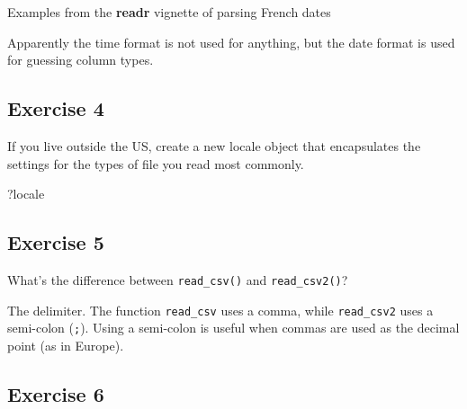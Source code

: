 \documentclass[]{book}
\newenvironment{Shaded}{\begin{snugshade}}{\end{snugshade}}
\newcommand{\CommentTok}[1]{\textcolor[rgb]{0.56,0.35,0.01}{\textit{#1}}}
\newcommand{\DataTypeTok}[1]{\textcolor[rgb]{0.13,0.29,0.53}{#1}}
\newcommand{\KeywordTok}[1]{\textcolor[rgb]{0.13,0.29,0.53}{\textbf{#1}}}
\newcommand{\NormalTok}[1]{#1}
\newcommand{\StringTok}[1]{\textcolor[rgb]{0.31,0.60,0.02}{#1}}
\theoremstyle{definition}
\theoremstyle{definition}
\theoremstyle{definition}
\theoremstyle{remark}
\begin{document}
Examples from the \textbf{readr} vignette of parsing French dates

\begin{Shaded}
\end{Shaded}

Apparently the time format is not used for anything, but the date format
is used for guessing column types.

\hypertarget{exercise-4-11}{%
\subsection{Exercise 4}\label{exercise-4-11}}

If you live outside the US, create a new locale object that encapsulates
the settings for the types of file you read most commonly.

\begin{Shaded}
\begin{Highlighting}[]
\NormalTok{?locale}
\end{Highlighting}
\end{Shaded}

\hypertarget{exercise-5-6}{%
\subsection{Exercise 5}\label{exercise-5-6}}

What's the difference between \texttt{read\_csv()} and
\texttt{read\_csv2()}?

The delimiter. The function \texttt{read\_csv} uses a comma, while
\texttt{read\_csv2} uses a semi-colon (\texttt{;}). Using a semi-colon
is useful when commas are used as the decimal point (as in Europe).

\hypertarget{exercise-6-6}{%
\subsection{Exercise 6}\label{exercise-6-6}}
\end{document}
